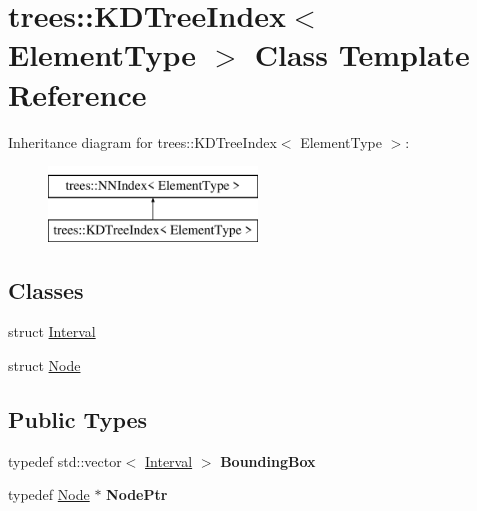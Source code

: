 \hypertarget{classtrees_1_1_k_d_tree_index}{}\section{trees\+:\+:K\+D\+Tree\+Index$<$ Element\+Type $>$ Class Template Reference}
\label{classtrees_1_1_k_d_tree_index}
Inheritance diagram for trees\+:\+:K\+D\+Tree\+Index$<$ Element\+Type $>$\+:\begin{figure}[H]
\begin{center}
\leavevmode
\includegraphics[height=2.000000cm]{classtrees_1_1_k_d_tree_index}
\end{center}
\end{figure}
\subsection*{Classes}
\begin{DoxyCompactItemize}
\item 
struct \hyperlink{structtrees_1_1_k_d_tree_index_1_1_interval}{Interval}
\item 
struct \hyperlink{structtrees_1_1_k_d_tree_index_1_1_node}{Node}
\end{DoxyCompactItemize}
\subsection*{Public Types}
\begin{DoxyCompactItemize}
\item 
\mbox{\label{classtrees_1_1_k_d_tree_index_a18fc026725b0201b5086e03dd1904035}} 
typedef std\+::vector$<$ \hyperlink{structtrees_1_1_k_d_tree_index_1_1_interval}{Interval} $>$ {\bfseries Bounding\+Box}
\item 
\mbox{\label{classtrees_1_1_k_d_tree_index_a2354de5f76b2a9325a991f5c3017b05c}} 
typedef \hyperlink{structtrees_1_1_k_d_tree_index_1_1_node}{Node} $\ast$ {\bfseries Node\+Ptr}
\end{DoxyCompactItemize}
